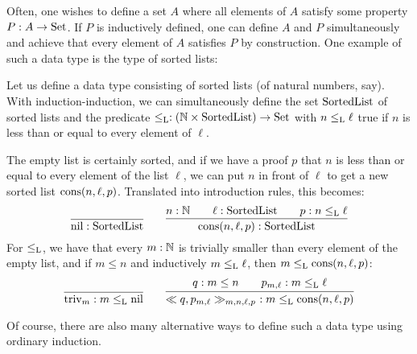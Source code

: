 \documentclass{article}
\begin{document}
Often, one wishes to define a set $A$ where all elements of $A$
satisfy some property $P : A \to \text{Set}$. If $P$ is inductively defined,
one can define $A$ and $P$ simultaneously and achieve that every
element of $A$ satisfies $P$ by construction. One example of such a
data type is the type of sorted lists:

\begin{example} %
\label{ex:sorted-list}

Let us define a data type consisting of sorted lists (of natural
numbers, say). With induction-induction, we can simultaneously define
the set $\text{SortedList}$ of sorted lists and the predicate $\leq_{\text{L}} :
(\mathbb{N} \times \text{SortedList}) \to \text{Set}$ with $n \leq_{\text{L}} \ell$ true if
$n$ is less than or equal to every element of $\ell$.

The empty list is certainly sorted, and if we have a proof $p$ that
$n$ is less than or equal to every element of the list $\ell$, we can
put $n$ in front of $\ell$ to get a new sorted list
$\text{cons}(n, \ell, p)$. Translated into introduction rules, this becomes:
\[
\infer{\nilList : \SortedList}{} \qquad
\infer{\consList{n}{\ell}{p} : \SortedList}{n : \Nat \quad & \ell : \SortedList \quad & p : n \lessList \ell}
\]
For $\leq_{\text{L}}$, we have that every $m : \mathbb{N}$ is trivially smaller
than every element of the empty list, and if $m \leq n$ and
inductively $m \leq_{\text{L}} \ell$, then $m \leq_{\text{L}} \text{cons}(n, \ell, p)$:
\[
\infer{\nilLess{m} : m \lessList \nilList}
{} \qquad
\infer{\consLess{n}{\ell}{p}{m}{q}{p_{m, \ell}}\ : m \lessList \consList{n}{\ell}{p}}
       {q : m \leq n \quad & p_{m, \ell} : m \lessList \ell}
\]

 Of course, there are also many alternative ways to define such a data type
 using ordinary induction.
\blackqed
\end{example}
\end{document}
